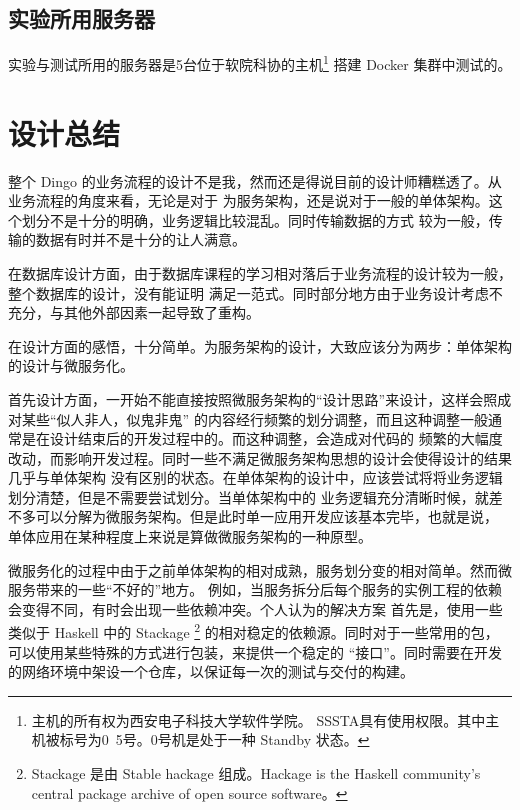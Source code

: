 \documentclass{dingo}
\begin{document}
    \subsection*{实验所用服务器}
      实验与测试所用的服务器是5台位于软院科协的主机\footnote{主机的所有权为西安电子科技大学软件学院。
        SSSTA具有使用权限。其中主机被标号为0~5号。0号机是处于一种 Standby 状态。}
      搭建 Docker 集群中测试的。
      
  \newpage
  \makecontent
  
  \section{设计总结}
    整个 Dingo 的业务流程的设计不是我，然而还是得说目前的设计师糟糕透了。从业务流程的角度来看，无论是对于
    为服务架构，还是说对于一般的单体架构。这个划分不是十分的明确，业务逻辑比较混乱。同时传输数据的方式
    较为一般，传输的数据有时并不是十分的让人满意。
    
    在数据库设计方面，由于数据库课程的学习相对落后于业务流程的设计较为一般，整个数据库的设计，没有能证明
    满足一范式。同时部分地方由于业务设计考虑不充分，与其他外部因素一起导致了重构。
    
    在设计方面的感悟，十分简单。为服务架构的设计，大致应该分为两步：单体架构的设计与微服务化。
    
    首先设计方面，一开始不能直接按照微服务架构的“设计思路”来设计，这样会照成对某些“似人非人，似鬼非鬼”
    的内容经行频繁的划分调整，而且这种调整一般通常是在设计结束后的开发过程中的。而这种调整，会造成对代码的
    频繁的大幅度改动，而影响开发过程。同时一些不满足微服务架构思想的设计会使得设计的结果几乎与单体架构
    没有区别的状态。在单体架构的设计中，应该尝试将将业务逻辑划分清楚，但是不需要尝试划分。当单体架构中的
    业务逻辑充分清晰时候，就差不多可以分解为微服务架构。但是此时单一应用开发应该基本完毕，也就是说，
    单体应用在某种程度上来说是算做微服务架构的一种原型。
    
    微服务化的过程中由于之前单体架构的相对成熟，服务划分变的相对简单。然而微服务带来的一些“不好的”地方。
    例如，当服务拆分后每个服务的实例工程的依赖会变得不同，有时会出现一些依赖冲突。个人认为的解决方案
    首先是，使用一些类似于 Haskell 中的 Stackage 
    \footnote{Stackage 是由 Stable hackage 组成。Hackage is the Haskell community's central
        package archive of open source software。} 
    的相对稳定的依赖源。同时对于一些常用的包，可以使用某些特殊的方式进行包装，来提供一个稳定的
    “接口”。同时需要在开发的网络环境中架设一个仓库，以保证每一次的测试与交付的构建。
    
\end{document}
